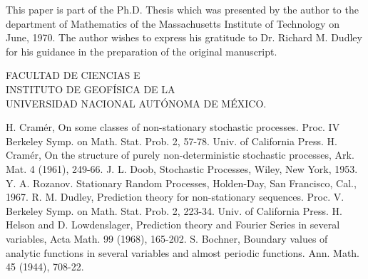 \documentclass{article}
\begin{document}
This paper is part of the Ph.D. Thesis which was presented by the author to
the department of Mathematics of the Massachusetts Institute of Technology
on June, 1970. The author wishes to express his gratitude to Dr. Richard M.
Dudley for his guidance in the preparation of the original manuscript.

\begin{center}
FACULTAD DE CIENCIAS E\\
INSTITUTO DE GEOFÍSICA DE LA\\
UNIVERSIDAD NACIONAL AUTÓNOMA DE MÉXICO.
\end{center}

\begin{thebibliography}{99}
 H. Cramér, On some classes of non-stationary stochastic processes. Proc. IV Berkeley Symp. on Math. Stat. Prob. 2, 57-78. Univ. of California Press.
 H. Cramér, On the structure of purely non-deterministic stochastic processes, Ark. Mat. 4 (1961), 249-66.
 J. L. Doob, Stochastic Processes, Wiley, New York, 1953.
 Y. A. Rozanov. Stationary Random Processes, Holden-Day, San Francisco, Cal., 1967.
 R. M. Dudley, Prediction theory for non-stationary sequences. Proc. V. Berkeley Symp. on Math. Stat. Prob. 2, 223-34. Univ. of California Press.
 H. Helson and D. Lowdenslager, Prediction theory and Fourier Series in several variables, Acta Math. 99 (1968), 165-202.
 S. Bochner, Boundary values of analytic functions in several variables and almost periodic functions. Ann. Math. 45 (1944), 708-22.
\end{thebibliography}
\end{document}
